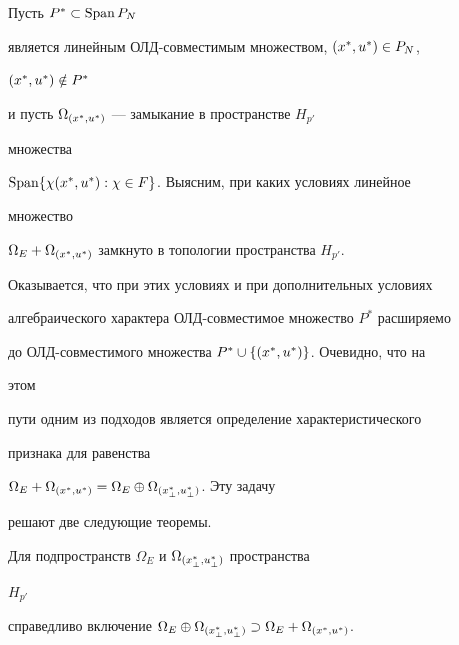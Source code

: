  


Пусть $P^*\subset\operatorname{Span} P_N$ 


является линейным ОЛД-совместимым множеством, ${(x^*_{},u^*_{})}\in P_N$, 


${(x^*_{},u^*_{})}\notin P^*$ 


и пусть $\Omega_{{(x^*_{},u^*_{})}}$ --- замыкание в пространстве $H_{p'}$ 


множества 


$\operatorname{Span}\{\chi{(x^*_{},u^*_{})}:\chi\in F\}$. Выясним, при каких условиях линейное 


множество 


$\Omega_E+\Omega_{{(x^*_{},u^*_{})}}$ замкнуто в топологии пространства $H_{p'}$. 


Оказывается, что при этих условиях и при дополнительных условиях 


алгебраического характера ОЛД-совместимое множество $P^*$ расширяемо 


до ОЛД-совместимого множества $P^*\cup\{{(x^*_{},u^*_{})}\}$. Очевидно, что на 


этом 


пути одним из подходов является определение характеристического 


признака для равенства 


$\Omega_E+\Omega_{{(x^*_{},u^*_{})}}=\Omega_E\oplus\Omega_{{(x^*_{\bot},u^*_{\bot})}}$. Эту задачу 


решают две следующие теоремы. 


 


\begin{thm} 


Для подпространств $\Omega_E$ и $\Omega_{{(x^*_{\bot},u^*_{\bot})}}$ пространства 


$H_{p'}$ 


справедливо включение $\Omega_E\oplus\Omega_{\myxu{\bot}}\supset 


\Omega_E+\Omega_{\myxu{}}$. 


\end{thm} 


 


